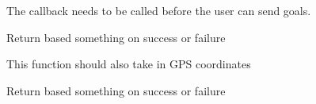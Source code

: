 
\begin{DoxyRefList}
\item[\label{todo__todo000001}%
\hypertarget{todo__todo000001}{}%
\-Member \hyperlink{classplanner__request_1_1get__state_1_1_staterobot_ae54f70c890bd5e13ceba777ca15d37ab}{planner\-\_\-request.get\-\_\-state.\-Staterobot.\-\_\-\-\_\-init\-\_\-\-\_\-} ]\-The callback needs to be called before the user can send goals. 
\item[\label{todo__todo000002}%
\hypertarget{todo__todo000002}{}%
\-Member \hyperlink{classplanner__request_1_1get__state_1_1_staterobot_a8e0ac5967abcc4612fde86cc3e91654d}{planner\-\_\-request.get\-\_\-state.\-Staterobot.send\-\_\-goal} ]\-Return based something on success or failure 

\-This function should also take in \-G\-P\-S coordinates  
\item[\label{todo__todo000003}%
\hypertarget{todo__todo000003}{}%
\-Member \hyperlink{classplanner__request_1_1get__state_1_1_staterobot_a0bd7ca2bc1f416e09cb2590ae20029a1}{planner\-\_\-request.get\-\_\-state.\-Staterobot.send\-\_\-goal\-\_\-relative} ]\-Return based something on success or failure 
\end{DoxyRefList}